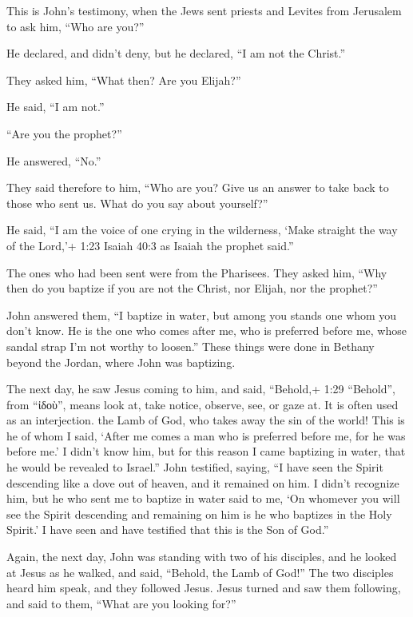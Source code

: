  This is John's testimony, when the Jews sent priests and
Levites from Jerusalem to ask him, ``Who are you?''

 He declared, and didn't deny, but he declared, ``I am not
the Christ.''

 They asked him, ``What then? Are you Elijah?''

He said, ``I am not.''

``Are you the prophet?''

He answered, ``No.''

 They said therefore to him, ``Who are you? Give us an
answer to take back to those who sent us. What do you say about
yourself?''

 He said, ``I am the voice of one crying in the wilderness,
`Make straight the way of the Lord,'+ 1:23 Isaiah 40:3 as Isaiah the
prophet said.''

 The ones who had been sent were from the Pharisees.
 They asked him, ``Why then do you baptize if you are not
the Christ, nor Elijah, nor the prophet?''

 John answered them, ``I baptize in water, but among you
stands one whom you don't know.  He is the one who comes
after me, who is preferred before me, whose sandal strap I'm not worthy
to loosen.''  These things were done in Bethany beyond the
Jordan, where John was baptizing.

 The next day, he saw Jesus coming to him, and said,
``Behold,+ 1:29 ``Behold'', from ``ἰδοὺ'', means look at, take notice,
observe, see, or gaze at. It is often used as an interjection. the Lamb
of God, who takes away the sin of the world!  This is he of
whom I said, `After me comes a man who is preferred before me, for he
was before me.'  I didn't know him, but for this reason I
came baptizing in water, that he would be revealed to Israel.''
 John testified, saying, ``I have seen the Spirit
descending like a dove out of heaven, and it remained on him.
 I didn't recognize him, but he who sent me to baptize in
water said to me, `On whomever you will see the Spirit descending and
remaining on him is he who baptizes in the Holy Spirit.'  I
have seen and have testified that this is the Son of God.''

 Again, the next day, John was standing with two of his
disciples,  and he looked at Jesus as he walked, and said,
``Behold, the Lamb of God!''  The two disciples heard him
speak, and they followed Jesus.  Jesus turned and saw them
following, and said to them, ``What are you looking for?''

